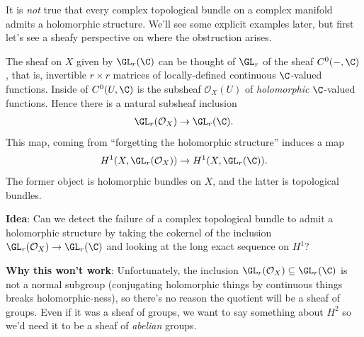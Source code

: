 \documentclass[11pt]{amsart}
\begin{document}
It is \emph{not} true that every complex topological bundle on a complex manifold admits a holomorphic structure. We'll see some explicit examples later, but first let's see a sheafy perspective on where the obstruction arises.

The sheaf on $X$ given by $\GL_r(\C)$ can be thought of $\GL_r$ of the sheaf $C^0(-,\C)$, that is, invertible $r \times r$ matrices of locally-defined continuous $\C$-valued functions. Inside of $C^0(U,\C)$ is the subsheaf $\mathcal{O}_X(U)$ of \emph{holomorphic} $\C$-valued functions. Hence there is a natural subsheaf inclusion
\begin{align*}
    \GL_r(\mathcal{O}_X) \to \GL_r(\C).
\end{align*}
This map, coming from ``forgetting the holomorphic structure'' induces a map
\begin{align*}
    H^1(X, \GL_r(\mathcal{O}_X)) \to H^1(X,\GL_r(\C)).
\end{align*}
The former object is holomorphic bundles on $X$, and the latter is topological bundles.

\textbf{Idea}: Can we detect the failure of a complex topological bundle to admit a holomorphic structure by taking the cokernel of the inclusion $\GL_r(\mathcal{O}_X) \to \GL_r(\C)$ and looking at the long exact sequence on $H^1$?

\textbf{Why this won't work}: Unfortunately, the inclusion $\GL_r(\mathcal{O}_X) \subseteq \GL_r(\C)$ is not a normal subgroup (conjugating holomorphic things by continuous things breaks holomorphic-ness), so there's no reason the quotient will be a sheaf of groups. Even if it was a sheaf of groups, we want to say something about $H^2$ so we'd need it to be a sheaf of \emph{abelian} groups.
\end{document}
